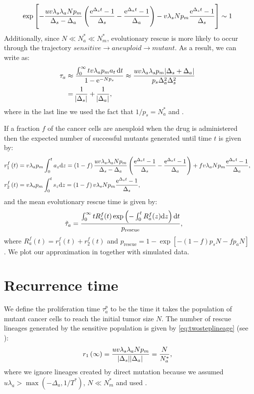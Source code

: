 \documentclass[12pt]{extarticle}
\renewcommand{\d}[1]{\ensuremath{\operatorname{d}\!{#1}}}
\renewcommand{\d}{{\rm d}}
\newcommand{\e}{{\rm e}}
\newcommand{\presc}{p_\text{rescue}}
\begin{document}
\begin{appendices}
\begin{equation*}
\exp\left[-\frac{uv\lambda_s\lambda_aNp_m}{\Delta_s-\Delta_a}\left(\frac{\e^{\Delta_s t}-1}{\Delta_s}-\frac{\e^{\Delta_a t}-1}{\Delta_a}\right)-v\lambda_sNp_m\frac{\e^{\Delta_s t}-1}{\Delta_s}\right] \sim 1
\end{equation*}
Additionally, since $N\ll N_a^*\ll N_m^*$, evolutionary rescue is more likely to occur through the trajectory $sensitive \rightarrow aneuploid \rightarrow mutant$. As a result, we can write  as:
\begin{align}\nonumber
\tau_a&\approx\frac{\int_0^\infty t v\lambda_ap_ma_t \,\d t}{1-\e^{-Np_s}}\approx\frac{uv\lambda_a\lambda_sp_m\abs{\Delta_s+\Delta_a}}{p_s\Delta_a^2\Delta_s^2}\\ \label{limitapprox4} %
&=\frac{1}{\abs{\Delta_s}}+\frac{1}{\abs{\Delta_a}},
\end{align} %
where in the last line we used the fact that $1/p_s=N_a^*$ and . %

If a fraction $f$ of the cancer cells are aneuploid when the drug is administered then the expected number of successful mutants generated until time $t$ is given by: %
\begin{align*}
r_1^f\left(t\right)&=v\lambda_ap_m\int_0^ta_{z} \d z = \left(1-f\right)\frac{uv\lambda_s\lambda_aNp_m}{\Delta_s-\Delta_a}\left(\frac{\e^{\Delta_st}-1}{\Delta_s}-\frac{\e^{\Delta_at}-1}{\Delta_a}\right)+fv\lambda_aNp_m\frac{\e^{\Delta_a t}-1}{\Delta_a},\\ 
r_2^f\left(t\right)&=v\lambda_sp_m\int_0^ts_{z} \d z = \left(1-f\right)v\lambda_sNp_m\frac{\e^{\Delta_s t}-1}{\Delta_s},
\end{align*} 
and the mean evolutionary rescue time is given by:
\begin{align}\label{meantimet2SGV}
\tilde{\tau}_a&= \frac{\int_{0}^{\infty}{tR_a^f(t)\exp\left(-\int_0^{t}{R_a^f(z)\d z}\right) \d t}}{\presc},
\end{align}
where $R_a^f(t)=r_1^f\left(t\right)+r_2^f\left(t\right)$ and $\presc = 1-\exp\left[-\left(1-f\right)p_sN-fp_aN\right]$. We plot our approximation in   together with simulated data.

\section{Recurrence time}\label{sec:appendix_recurrence_time}
We define the proliferation time $\tau_a^p$  to be the time it takes the population of mutant cancer cells to reach the initial tumor size $N$. The number of rescue lineages generated by the sensitive population is given by  \cref{eq:twosteplineage} (see ):
\begin{equation*}
r_1\left(\infty\right)=\frac{uv\lambda_s\lambda_aNp_m}{\abs{\Delta_s}\abs{\Delta_a}}=\frac{N}{N_a^*},
\end{equation*}
where we ignore lineages created by direct mutation because we assumed $u\lambda_a > \max{(-\Delta_a, 1/T^*)}$, $N\ll N_m^*$ and used .


\end{appendices}
\end{document}
